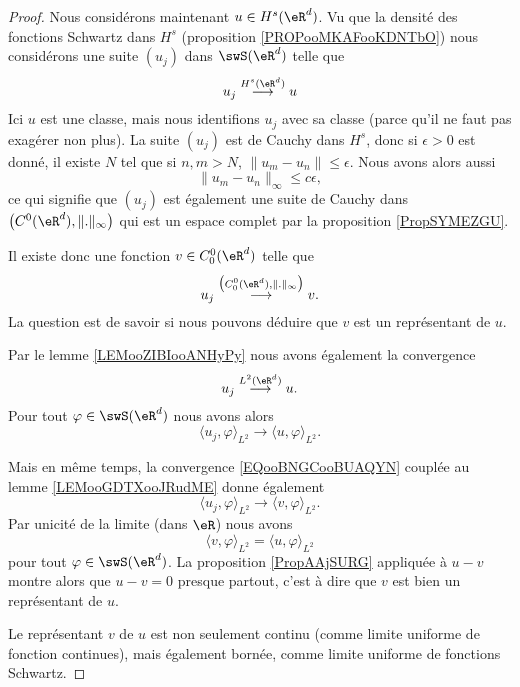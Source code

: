 \begin{proof}
    Nous considérons maintenant \( u\in H^s(\eR^d)\). Vu que la densité des fonctions Schwartz dans \( H^s\) (proposition \ref{PROPooMKAFooKDNTbO}) nous considérons une suite \( (u_j)\) dans \( \swS(\eR^d)\) telle que
    \begin{equation}
        u_j\stackrel{H^s(\eR^d)}{\longrightarrow}u
    \end{equation}
    Ici \( u\) est une classe, mais nous identifions \( u_j\) avec sa classe (parce qu'il ne faut pas exagérer non plus). La suite \( (u_j)\) est de Cauchy dans \( H^s\), donc si \( \epsilon>0\) est donné, il existe \( N\) tel que si \( n,m>N\), \( \| u_m-u_n \|\leq \epsilon\). Nous avons alors aussi
    \begin{equation}
        \| u_m-u_n \|_{\infty}\leq c\epsilon,
    \end{equation}
    ce qui signifie que \( (u_j)\) est également une suite de Cauchy dans \( \big( C^0(\eR^d),\| . \|_{\infty} \big)\) qui est un espace complet par la proposition \ref{PropSYMEZGU}.

    Il existe donc une fonction \( v\in C_0^0(\eR^d)\) telle que
    \begin{equation}        \label{EQooBNGCooBUAQYN}
        u_j\stackrel{\big( C^0_0(\eR^d), \| . \|_{\infty} \big)}{\longrightarrow}v.
    \end{equation}
    La question est de savoir si nous pouvons déduire que \( v\) est un représentant de \( u\). 

    Par le lemme \ref{LEMooZIBIooANHyPy} nous avons également la convergence
    \begin{equation}
        u_j\stackrel{L^2(\eR^d)}{\longrightarrow} u.
    \end{equation}
    Pour tout \( \varphi\in \swS(\eR^d)\) nous avons alors
    \begin{equation}
        \langle u_j, \varphi\rangle_{L^2}\to\langle u, \varphi\rangle_{L^2}.
    \end{equation}
    
    Mais en même temps, la convergence \eqref{EQooBNGCooBUAQYN} couplée au lemme \ref{LEMooGDTXooJRudME} donne également 
    \begin{equation}
        \langle u_j, \varphi\rangle_{L^2}\to \langle v, \varphi\rangle_{L^2}.
    \end{equation}
    Par unicité de la limite (dans \( \eR\)) nous avons 
    \begin{equation}
        \langle v, \varphi\rangle_{L^2}=\langle u, \varphi\rangle_{L^2}
    \end{equation}
    pour tout \( \varphi\in\swS(\eR^d)\). La proposition \ref{PropAAjSURG} appliquée à \( u-v\) montre alors que \( u-v=0\) presque partout, c'est à dire que \( v\) est bien un représentant de \( u\).

    Le représentant \( v\) de \( u\) est non seulement continu (comme limite uniforme de fonction continues), mais également bornée, comme limite uniforme de fonctions Schwartz.
\end{proof}

